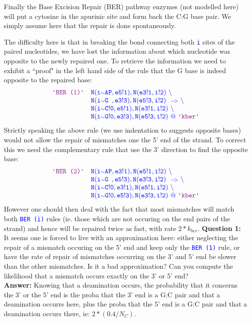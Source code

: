 \documentclass[11pt]{article}
\def\ttt#1{\texttt{\textcolor{blue}{#1}}}
\def\lab#1{\hbox{\ttt{\color{Plum}\textquotesingle #1\textquotesingle}}}
\def\int{{\scriptstyle\sim}}
\def\Kar{\ {\scriptstyle\tt-\! >}\ }
\begin{document}
Finally the Base Excision Repair (BER) pathway enzymes (not modelled here) will put a cytosine in the apurinic site and form back the C:G base pair. We simply assume here that the repair is done spontaneously. 

The difficulty here is that in breaking the bond connecting both \ttt{i} sites of the paired nucleotides, we have lost the information about which nucleotide was opposite to the newly repaired one. To retrieve the information we need to exhibit a ``proof" in the left hand side of the rule that the G base is indeed opposite to the repaired base:
$$
\begin{array}{llll}
\lab{BER (1)}& \tt\color{blue} N(i\int AP,e5!1),N(e3!1,i!2)\ \backslash \\
& \tt\color{blue} N(i\int G\,\,\, ,e3!3),N(e5!3,i!2) \ \Kar \backslash \\
& \tt\color{blue} N(i\int C!0,e5!1),N(e3!1,i!2)\ \backslash \\
& \tt\color{blue} N(i\int G!0,e3!3),N(e5!3,i!2) \ @\ \lab{kber}
\end{array}
$$
Strictly speaking the above rule (we use indentation to suggests opposite bases) would not allow the repair of mismatches one the 5' end of the strand. To correct this we need the complementary rule that use the 3' direction to find the opposite base:
$$
\begin{array}{llll}
\lab{BER (2)}& \tt\color{blue} N(i\int AP,e3!1),N(e5!1,i!2)\ \backslash \\
& \tt\color{blue} N(i\int G\,\,\, ,e5!3),N(e3!3,i!2) \ \Kar \backslash \\
& \tt\color{blue} N(i\int C!0,e3!1),N(e5!1,i!2)\ \backslash \\
& \tt\color{blue} N(i\int G!0,e5!3),N(e3!3,i!2) \ @\ \lab{kber}
\end{array}
$$
However one should then deal with the fact that most mismatches will match both \lab{BER (i)} rules (ie. those which are not occuring on the end pairs of the strand) and hence will be repaired twice as fast, with rate $2*k_{\mathit{ber}}$. 
\vskip 0.25cm
\noindent\textbf{Question 1:} It seems one is forced to live with an approximation here: either neglecting the repair of a mismatch occuring on the 5' end and keep only the \lab{BER (1)} rule, or have the rate of repair of mismatches occurring on the 3' and 5' end be slower than the other mismatches. Is it a bad approximation? Can you compute the likelihood that a mismatch occurs exactly on the 3' or 5' end? 
\\\textbf{Answer:} Knowing that a deamination occurs, the probability that it concerns the 3' or the 5' end is the proba that the 3' end is a G:C pair and that a deamination occurrs here, plus the proba that the 5' end is a G:C pair and that a deamination occurs there, ie: $2*(0.4 / N_C)$.
\end{document}
